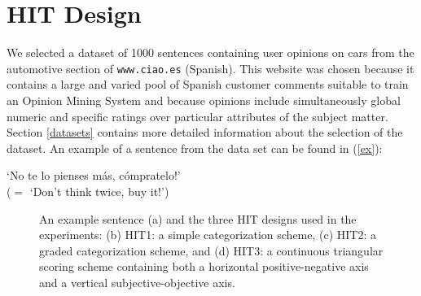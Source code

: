 \documentclass[11pt,letterpaper]{article}
\begin{document}
\section{HIT Design}
\label{sect:design}

We selected a dataset of 1000 sentences containing user opinions on cars from the automotive section of \texttt{www.ciao.es} (Spanish). This website was chosen because it contains a large and varied pool of Spanish customer comments suitable to train an Opinion Mining System and because opinions include simultaneously global numeric and specific ratings over particular attributes of the subject matter. Section \ref{datasets} contains more detailed information about the selection of the dataset. An example of a sentence from the data set can be found in (\ref{ex}):

\begin{li}
  \label{ex}
  `No te lo pienses m\'{a}s, c\'{o}mpratelo!'\\
  ($=$ `Don't think twice, buy it!')
\end{li}

\begin{figure}
  \begin{center}
	\caption{An example sentence (a) and the three HIT designs used in the experiments: (b) HIT1: a simple categorization scheme, (c) HIT2: a graded categorization scheme, and (d) HIT3: a continuous triangular scoring scheme containing both a horizontal positive-negative axis and a vertical subjective-objective axis.}
	\label{hits}
  \end{center}
\end{figure}
\end{document}
